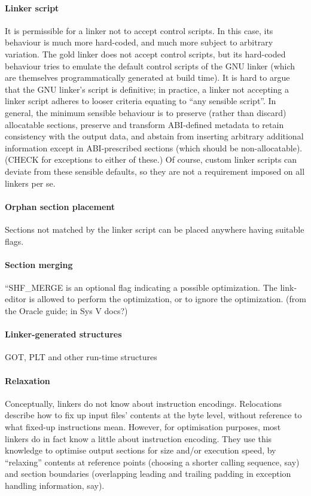 \paragraph{Linker script}
It is permissible for a linker not to accept control scripts.
In this case, its behaviour is much more hard-coded,
and much more subject to arbitrary variation.
The \textsf{gold} linker does not accept control scripts, 
but its hard-coded behaviour tries to emulate the default control scripts of the GNU linker
(which are themselves programmatically generated at build time).
It is hard to argue that the GNU linker's script is definitive; 
in practice, a linker not accepting a linker script
adheres to looser criteria equating to ``any sensible script''.
In general, the minimum sensible 
behaviour is to preserve (rather than discard) allocatable sections, 
preserve and transform ABI-defined metadata to retain consistency with the output data,
and abstain from inserting arbitrary additional information
except in ABI-prescribed sections (which should be non-allocatable).  (CHECK for exceptions to either of these.)
Of course, custom linker scripts can deviate from these sensible defaults,
so they are not a requirement imposed on all linkers per se.

\paragraph{Orphan section placement}
Sections not matched by the linker script can be placed anywhere
having suitable flags.

\paragraph{Section merging}
``SHF\_MERGE is an optional flag indicating a possible optimization. The link-editor is allowed to perform the optimization, or to ignore the optimization. 
(from the Oracle guide; in Sys V docs?)

\paragraph{Linker-generated structures}
GOT, PLT and other run-time structures

\paragraph{Relaxation}
Conceptually, linkers do not know about instruction encodings.
Relocations describe how to fix up input files' contents at the byte level,
without reference to what fixed-up instructions mean.
However, for optimisation purposes, most linkers do in fact
know a little about instruction encoding.
They use this knowledge to optimise output sections
for size and/or execution speed, by ``relaxing'' contents
at reference points (choosing a shorter calling sequence, say) 
and section boundaries (overlapping leading and trailing padding in exception
handling information, say).

